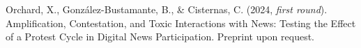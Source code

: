 \begin{publications}
\begin{benumerate}{7}

\item{Orchard, X., González-Bustamante, B., \& Cisternas, C. (2024, {\itshape first round}). Amplification, Contestation, and Toxic Interactions with News: Testing the Effect of a Protest Cycle in Digital News Participation. Preprint upon request.}\vspace{1mm}

\end{benumerate}

\end{publications}


